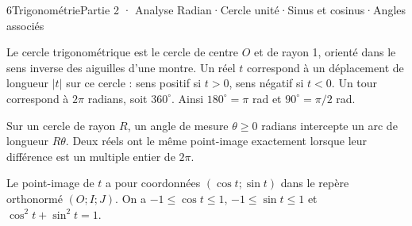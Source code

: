 \begin{ouverture}[trigo]{6}{Trigonométrie}{Partie 2 · Analyse}
{Radian\enspace·\enspace Cercle unité\enspace·\enspace Sinus et cosinus\enspace·\enspace Angles associés}
\end{ouverture}
\essentiel
{}
\begin{definition}
Le cercle trigonométrique est le cercle de centre $O$ et de rayon 1, orienté
dans le sens inverse des aiguilles d'une montre. Un réel $t$ correspond à un
déplacement de longueur $|t|$ sur ce cercle : sens positif si $t>0$, sens
négatif si $t<0$. Un tour correspond à $2\pi$ radians, soit $360^\circ$.
Ainsi $180^\circ=\pi$ rad et $90^\circ=\pi/2$ rad.
\end{definition}
\begin{propriete}
Sur un cercle de rayon $R$, un angle de mesure $\theta\geq0$ radians intercepte
un arc de longueur $R\theta$. Deux réels ont le même point-image exactement
lorsque leur différence est un multiple entier de $2\pi$.
\end{propriete}
\begin{definition}
Le point-image de $t$ a pour coordonnées $(\cos t;\sin t)$ dans le repère
orthonormé $(O;I;J)$. On a $-1\leq\cos t\leq1$, $-1\leq\sin t\leq1$ et
$\cos^2t+\sin^2t=1$.
\end{definition}
\begin{center}
\par{}
\end{center}

